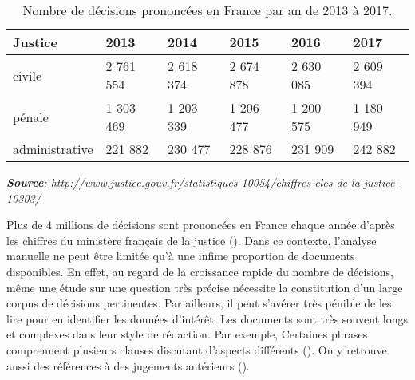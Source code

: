 \begin{table}[!htb]
 	\small
 	\begin{center}
 		\begin{tabular}{|l|l|l|l|l|l|}
 			\hline
 			\textbf{Justice}	& \textbf{2013}  & \textbf{2014}  & \textbf{2015}  & \textbf{2016}  & \textbf{2017}  \\ \hline
 			civile   & 2 761 554 & 2 618 374 & 2 674 878 & 2 630 085 & 2 609 394 \\ \hline
 			pénale   & 1 303 469 & 1 203 339 & 1 206 477 & 1 200 575 & 1 180 949 \\ \hline
 			administrative & 221 882 & 230 477 & 228 876 & 231 909 & 242 882 \\ \hline
 		\end{tabular}
 		
 		\textit{\scriptsize{\textbf{Source}: \url{http://www.justice.gouv.fr/statistiques-10054/chiffres-cles-de-la-justice-10303/}}}  
 	\end{center}
 	\caption{Nombre de décisions prononcées en France par an de 2013 à 2017.}\label{tab:intro:nbdecisionstats}
 \end{table}
Plus de 4 millions de décisions sont prononcées en France chaque année d'après les chiffres du ministère français de la justice (). Dans ce contexte, l'analyse manuelle ne peut être limitée qu'à une infime proportion de documents disponibles.
En effet, au regard de la croissance rapide du nombre de décisions, même une étude sur une question très précise nécessite la constitution d'un large corpus de décisions pertinentes. Par ailleurs, il peut s'avérer très pénible de les lire pour en identifier les données d'intérêt. Les documents sont très souvent longs et complexes dans leur style de rédaction. Par exemple, Certaines phrases comprennent plusieurs clauses discutant d'aspects différents (). On y retrouve aussi des références à des jugements antérieurs ().
